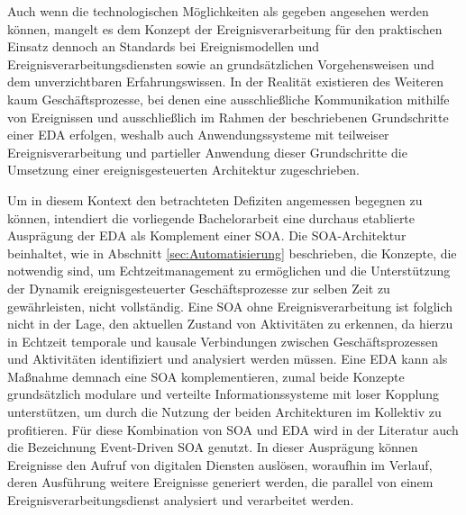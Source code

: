Auch wenn die technologischen Möglichkeiten als gegeben angesehen werden können, mangelt es dem Konzept der Ereignisverarbeitung für den praktischen Einsatz dennoch an Standards bei Ereignismodellen und Ereignisverarbeitungsdiensten sowie an grundsätzlichen Vorgehensweisen und dem unverzichtbaren Erfahrungswissen. 
\cite{Etzion.2011}
In der Realität existieren des Weiteren kaum Geschäftsprozesse, bei denen eine ausschließliche Kommunikation mithilfe von Ereignissen und ausschließlich im Rahmen der beschriebenen Grundschritte einer \ac{EDA} erfolgen, weshalb auch Anwendungssysteme mit teilweiser Ereignisverarbeitung und partieller Anwendung dieser Grundschritte die Umsetzung einer ereignisgesteuerten Architektur zugeschrieben.
\cite{Etzion.2011}


Um in diesem Kontext den betrachteten Defiziten angemessen begegnen zu können, intendiert die vorliegende Bachelorarbeit eine durchaus etablierte Ausprägung der \ac{EDA} als Komplement einer \ac{SOA}.
Die \ac{SOA}-Architektur beinhaltet, wie in Abschnitt \ref{sec:Automatisierung} beschrieben, die Konzepte, die notwendig sind, um Echtzeitmanagement zu ermöglichen und die Unterstützung der Dynamik ereignisgesteuerter Geschäftsprozesse zur selben Zeit zu gewährleisten, nicht vollständig.
Eine \ac{SOA} ohne Ereignisverarbeitung ist folglich nicht in der Lage, den aktuellen Zustand von Aktivitäten zu erkennen, da hierzu in Echtzeit temporale und kausale Verbindungen zwischen Geschäftsprozessen und Aktivitäten identifiziert und analysiert werden müssen. 
Eine \ac{EDA} kann als Maßnahme demnach eine \ac{SOA} komplementieren, zumal beide Konzepte grundsätzlich modulare und verteilte Informationssysteme mit loser Kopplung unterstützen, um durch die Nutzung der beiden Architekturen im Kollektiv zu profitieren. 
Für diese Kombination von \ac{SOA} und \ac{EDA} wird in der Literatur auch die Bezeichnung Event-Driven SOA genutzt. 
\cite{Bruns.2010}
In dieser Ausprägung können Ereignisse den Aufruf von digitalen Diensten auslösen, woraufhin im Verlauf, deren Ausführung weitere Ereignisse generiert werden, die parallel von einem Ereignisverarbeitungsdienst analysiert und verarbeitet werden. 
\cite{Bruns.2010}